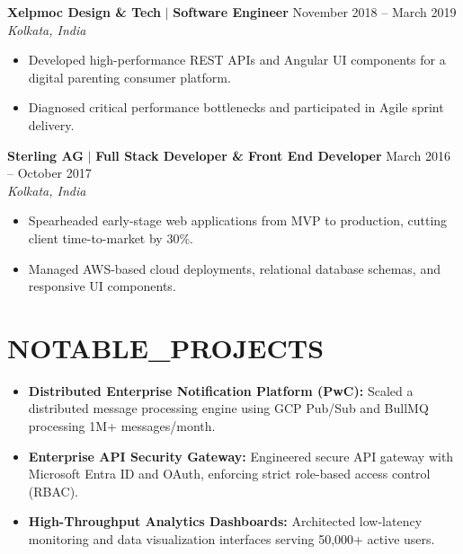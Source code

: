 \documentclass[10pt,letterpaper]{article}
\begin{document}
\vspace{1ex}
\noindent\textbf{\color{obsidian}Xelpmoc Design \& Tech} $|$ {\color{cyanhighlight}\textbf{Software Engineer}} \hfill {\small\ttfamily\color{mutedslate}November 2018 -- March 2019} \\
{\small\textit{\color{mutedslate}Kolkata, India}}
\begin{itemize}
    \item Developed high-performance REST APIs and Angular UI components for a digital parenting consumer platform.
    \item Diagnosed critical performance bottlenecks and participated in Agile sprint delivery.
\end{itemize}

\noindent\textbf{\color{obsidian}Sterling AG} $|$ {\color{cyanhighlight}\textbf{Full Stack Developer \& Front End Developer}} \hfill {\small\ttfamily\color{mutedslate}March 2016 -- October 2017} \\
{\small\textit{\color{mutedslate}Kolkata, India}}
\begin{itemize}
    \item Spearheaded early-stage web applications from MVP to production, cutting client time-to-market by 30\%.
    \item Managed AWS-based cloud deployments, relational database schemas, and responsive UI components.
\end{itemize}

\section*{NOTABLE\_PROJECTS}
\begin{itemize}
    \item \textbf{Distributed Enterprise Notification Platform (PwC):} Scaled a distributed message processing engine using GCP Pub/Sub and BullMQ processing 1M+ messages/month.
    \item \textbf{Enterprise API Security Gateway:} Engineered secure API gateway with Microsoft Entra ID and OAuth, enforcing strict role-based access control (RBAC).
    \item \textbf{High-Throughput Analytics Dashboards:} Architected low-latency monitoring and data visualization interfaces serving 50,000+ active users.
\end{itemize}

\end{document}
